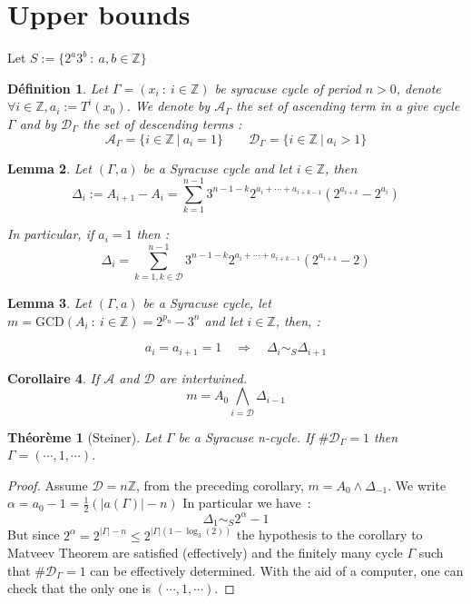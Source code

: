 \documentclass[12pt,a4paper]{article}
\newtheorem{lem}{Lemma}[section]
\newtheorem{cor}[lem]{Corollaire}
\newtheorem{defi}[lem]{Définition}
\newtheorem{theo}{Théorème}
\def\ZZ{\mathbb{Z}}
\def\A{\mathcal{A}}
\def\D{\mathcal{D}}
\begin{document}
\section{Upper bounds}
Let $S := \{2^a3^b ~:~ a,b\in \ZZ\}$
\begin{defi}\label{def:syracuse_cycle_period_denote} Let $\Gamma=(x_i~:~ i \in \ZZ)$ be syracuse cycle of period $n>0$, denote $\forall i\in\ZZ , a_i :=T^i(x_0)$.
 We denote by $\mathcal A_\Gamma$ the set of ascending term  in a give cycle $\Gamma$ and by $\mathcal D_\Gamma$ the set of descending terms : 
 $$\A_\Gamma = \{i\in \ZZ~|~ a_i=1\} \quad\quad \D_\Gamma = \{i\in \ZZ~|~ a_i>1\}$$
\end{defi}
\begin{lem}\label{lem:syracuse_cycle_n__n_}
Let $(\Gamma,a)$ be a Syracuse cycle and let $i\in\ZZ$, then 
$$ \Delta_i := A_{i+1}-A_{i} = \sum_{k=1}^{n-1}3^{n-1-k}2^{a_i+\cdots+a_{i+k-1}} \left(2^{a_{i+k}}-2^{a_i}\right)$$ 

In particular, if $a_i=1$ then :
$$ \Delta_i = \sum_{k=1,k\in\D}^{n-1}3^{n-1-k}2^{a_i+\cdots+a_{i+k-1}} \left(2^{a_{i+k}}-2\right)$$ 
\end{lem}
 
\begin{lem}\label{lem:syracuse_cycle}
Let $(\Gamma,a)$ be a Syracuse cycle, let $m = \mathrm{GCD}(A_i ~:~ i\in \ZZ)=2^{p_n}-3^n$ and let $i\in\ZZ$, then, : 

$$a_i=a_{i+1}=1 \quad\Rightarrow \quad\Delta_{i} \sim_S \Delta_{i+1}$$
\end{lem}

\begin{cor}\label{cor:intertwined_i_}
If $\A$ and $\D$ are intertwined.
$$ m = A_0\bigwedge_{i=\D}\Delta_{i-1} $$
\end{cor}

\begin{theo}[Steiner]\label{theo:steiner_2} Let $\Gamma$ be a Syracuse n-cycle.
 If $\#\D_\Gamma=1$ then $\Gamma = (\cdots,1,\cdots)$.  
\end{theo}
\begin{proof}
Assume $\D=n\ZZ$, from the preceding corollary,
$m = A_0 \wedge \Delta_{-1}$. We write $\alpha = a_0-1 = \frac{1}{2}(|a(\Gamma)|-n)$
In particular we have~:
$$\Delta_1 \sim_S  2^{\alpha}-1$$
But since $2^\alpha = 2^{|\Gamma|-n}\leq 2^{|\Gamma|(1-\log_3(2))}$ the hypothesis to the corollary to Matveev Theorem are satisfied (effectively) and the finitely many cycle $\Gamma$ such that $\#\D_\Gamma=1$ can be effectively determined. With the aid of a computer, one  can check that the only one is $(\cdots,1,\cdots)$.
\end{proof}
\end{document}
